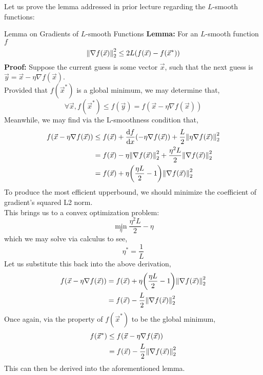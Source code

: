Let us prove the lemma addressed in prior lecture regarding the $L$-smooth functions:
\begin{ln-theorem}{Lemma on Gradients of $L$-smooth Functions}{}
    \textbf{Lemma:} For an $L$-smooth function $f$
    \[
        \pnorm[2]{\nabla f(\vec{x})}{2} \leq 2L (f(\vec{x}) - f(\vec{x}^*))
    \]
    \tcblower
    \textbf{Proof:} Suppose the current guess is some vector $\vec{x}$, such that the next guess is $\vec{y} =  \vec{x} - \eta \nabla f(\vec{x})$. \\
    Provided that $f(\vec{x}^*)$ is a global minimum, we may determine that,
    \[
        \forall \vec{x}, f(\vec{x}^*) \leq f(\vec{y}) = f(\vec{x} - \eta \nabla f(\vec{x}))
    \]
    Meanwhile, we may find via the L-smoothness condition that,
    \begin{align*}
        f(\vec{x} - \eta \nabla f(\vec{x}))
        &\leq f(\vec{x}) + \dv{f}{x} {} (-\eta \nabla f(\vec{x})) + \frac{L}{2} \pnorm[2]{\eta \nabla f(\vec{x})}{2} \\
        &= f(\vec{x}) - \eta \pnorm[2]{\nabla f(\vec{x})}{2} + \frac{\eta^2 L}{2} \pnorm[2]{\nabla f(\vec{x})}{2} \\
        &= f(\vec{x}) + \eta \bigg( \frac{\eta L}{2} - 1 \bigg) \pnorm[2]{\nabla f(\vec{x})}{2}
    \end{align*}
    To produce the most efficient upperbound, we should minimize the coefficient of gradient's squared L2 norm. \\
    This brings us to a convex optimization problem:
    \[
        \min_\eta \frac{\eta^2 L}{2} - \eta
    \]
    which we may solve via calculus to see,
    \[
        \eta^* = \frac{1}{L}
    \]
    Let us substitute this back into the above derivation,
    \begin{align*}
        f(\vec{x} - \eta \nabla f(\vec{x}))
        &= f(\vec{x}) + \eta \bigg( \frac{\eta L}{2} - 1 \bigg) \pnorm[2]{\nabla f(\vec{x})}{2} \\
        &= f(\vec{x}) - \frac{L}{2} \pnorm[2]{\nabla f(\vec{x})}{2}
    \end{align*}
    Once again, via the property of $f(\vec{x}^*)$ to be the global minimum,
    \begin{align*}
        f(\vec{x}^*)
        &\leq f(\vec{x} - \eta \nabla f(\vec{x})) \\
        &= f(\vec{x}) - \frac{L}{2} \pnorm[2]{\nabla f(\vec{x})}{2}
    \end{align*}
    This can then be derived into the aforementioned lemma.
\end{ln-theorem}

